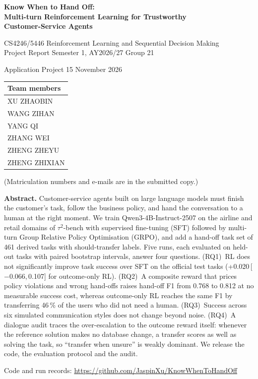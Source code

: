 \documentclass[12pt,a4paper]{article}
\newcommand{\tautwo}{$\tau^2$-bench}
\newcommand{\ci}[2]{\,[#1,\,#2]}
\edef\thisjob{\jobname}
\edef\submissionjob{\detokenize{submission}}
\begin{document}
\begin{titlepage}
\centering
{\Large\bfseries Know When to Hand Off:\\[2pt]
Multi-turn Reinforcement Learning for Trustworthy\\ Customer-Service Agents\par}
\vspace{10pt}
{\large CS4246/5446 Reinforcement Learning and Sequential Decision Making\\
Project Report \textperiodcentered{} Semester 1, AY2026/27 \textperiodcentered{} Group 21\par}
\vspace{6pt}
{Application Project \textperiodcentered{} 15 November 2026\par}
\vspace{14pt}
\ifx\thisjob\submissionjob
  
\else
  \begin{tabular}{l}
  \toprule
  \textbf{Team members}\\
  \midrule
  XU ZHAOBIN\\ WANG ZIHAN\\ YANG QI\\ ZHANG WEI\\ ZHENG ZHEYU\\ ZHENG ZHIXIAN\\
  \bottomrule
  \end{tabular}\par
  {\footnotesize (Matriculation numbers and e-mails are in the submitted copy.)\par}
\fi
\vspace{16pt}
\begin{minipage}{0.92\textwidth}
\small
\textbf{Abstract.}
Customer-service agents built on large language models must finish the
customer's task, follow the business policy, and hand the conversation to a
human at the right moment. We train Qwen3-4B-Instruct-2507 on the airline and
retail domains of \tautwo{} with supervised fine-tuning (SFT) followed by
multi-turn Group Relative Policy Optimisation (GRPO), and add a hand-off task
set of 461 derived tasks with should-transfer labels. Five runs, each
evaluated on held-out tasks with paired bootstrap intervals, answer four
questions. (RQ1)~RL does not significantly improve task success over SFT on
the official test tasks (+0.020\ci{$-0.066$}{0.107} for outcome-only RL).
(RQ2)~A composite reward that prices policy violations and wrong hand-offs
raises hand-off F1 from 0.768 to 0.812 at no measurable success cost, whereas
outcome-only RL reaches the same F1 by transferring 46\,\% of the users who
did not need a human. (RQ3)~Success across six simulated communication styles
does not change beyond noise. (RQ4)~A dialogue audit traces the
over-escalation to the outcome reward itself: whenever the reference solution
makes no database change, a transfer scores as well as solving the task, so
``transfer when unsure'' is weakly dominant. We release the code, the
evaluation protocol and the audit.
\end{minipage}
\vfill
{\footnotesize Code and run records: \url{https://github.com/JaspinXu/KnowWhenToHandOff}\par}
\end{titlepage}
\end{document}
